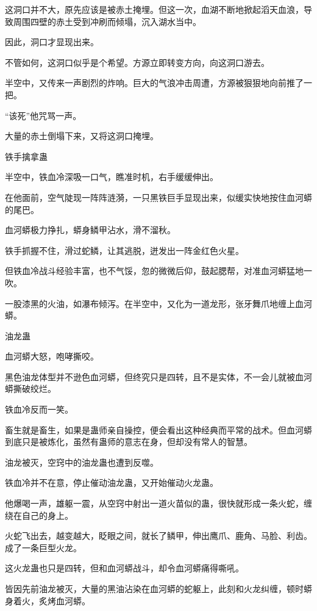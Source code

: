 
\begin{this_body}



这洞口并不大，原先应该是被赤土掩埋。但这一次，血湖不断地掀起滔天血浪，导致周围四壁的赤土受到冲刷而倾塌，沉入湖水当中。

因此，洞口才显现出来。

不管如何，这洞口似乎是个希望。方源立即转变方向，向这洞口游去。

半空中，又传来一声剧烈的炸响。巨大的气浪冲击周遭，方源被狠狠地向前推了一把。

“该死”他咒骂一声。

大量的赤土倒塌下来，又将这洞口掩埋。

铁手擒拿蛊

半空中，铁血冷深吸一口气，瞧准时机，右手缓缓伸出。

在他面前，空气陡现一阵阵涟漪，一只黑铁巨手显现出来，似缓实快地按住血河蟒的尾巴。

血河蟒极力挣扎，蟒身鳞甲沾水，滑不溜秋。

铁手抓握不住，滑过蛇鳞，让其逃脱，迸发出一阵金红色火星。

但铁血冷战斗经验丰富，也不气馁，忽的微微后仰，鼓起腮帮，对准血河蟒猛地一吹。

一股漆黑的火油，如瀑布倾泻。在半空中，又化为一道龙形，张牙舞爪地缠上血河蟒。

油龙蛊

血河蟒大怒，咆哮撕咬。

黑色油龙体型并不逊色血河蟒，但终究只是四转，且不是实体，不一会儿就被血河蟒撕破绞烂。

铁血冷反而一笑。

畜生就是畜生，如果是蛊师亲自操控，便会看出这种经典而平常的战术。但血河蟒到底只是被炼化，虽然有蛊师的意志在身，但却没有常人的智慧。

油龙被灭，空窍中的油龙蛊也遭到反噬。

铁血冷并不在意，停止催动油龙蛊，又开始催动火龙蛊。

他爆喝一声，雄躯一震，从空窍中射出一道火苗似的蛊，很快就形成一条火蛇，缠绕在自己的身上。

火蛇飞出去，越变越大，眨眼之间，就长了鳞甲，伸出鹰爪、鹿角、马脸、利齿。成了一条巨型火龙。

这火龙蛊也只是四转，但和血河蟒战斗，却令血河蟒痛得嘶吼。

皆因先前油龙被灭，大量的黑油沾染在血河蟒的蛇躯上，此刻和火龙纠缠，顿时蟒身着火，炙烤血河蟒。


\end{this_body}
